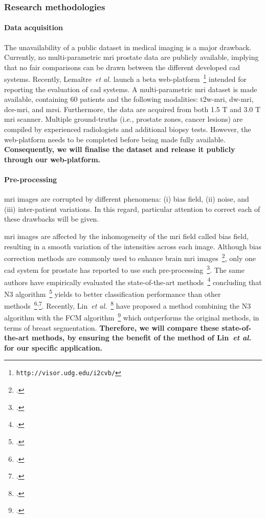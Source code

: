 \subsubsection{Research methodologies}
\label{sec:methodologies}

\paragraph{Data acquisition}

The unavailability of a public dataset in medical imaging is a major drawback.
Currently, no multi-parametric \ac{mri} prostate data are publicly available, implying that no fair comparisons can be drawn between the different developed \ac{cad} systems.
Recently, Lema\^itre~\emph{et al.} launch a beta web-platform~\footnote{\texttt{http://visor.udg.edu/i2cvb/}} intended for reporting the evaluation of \ac{cad} systems.
A multi-parametric \ac{mri} dataset is made available, containing 60 patients and the following modalities: \ac{t2w}-\ac{mri}, \ac{dw}-\ac{mri}, \ac{dce}-\ac{mri}, and \ac{mrsi}.
Furthermore, the data are acquired from both 1.5 T and 3.0 T \ac{mri} scanner.
Multiple ground-truths (i.e., prostate zones, cancer lesions) are compiled by experienced radiologists and additional biopsy tests.
However, the web-platform needs to be completed before being made fully available.
\textbf{Consequently, we will finalise the dataset and release it publicly through our web-platform.}

\paragraph{Pre-processing}

\Ac{mri} images are corrupted by different phenomena: (i) bias field, (ii) noise, and (iii) inter-patient variations.
In this regard, particular attention to correct each of these drawbacks will be given.

\Ac{mri} images are affected by the inhomogeneity of the \ac{mri} field called bias field, resulting in a smooth variation of the intensities across each image.
Although bias correction methods are commonly used to enhance brain \ac{mri} images~\footcite{Vovk2007}, only one \ac{cad} system for prostate has reported to use such pre-processing~\footcite{Viswanath2009}.
The same authors have empirically evaluated the state-of-the-art methods~\footcite{viswanath2011empirical} concluding that N3 algorithm~\footcite{Sled1998} yields to better classification performance than other methods~\footcite{Styner2000}\textsuperscript{,}\footcite{Cohen2000}.
Recently, Lin~\emph{et al.}~\footcite{Lin2011} have proposed a method combining the N3 algorithm with the FCM algorithm~\footcite{Ahmed2002} which outperforms the original methods, in terms of breast segmentation.
\textbf{Therefore, we will compare these state-of-the-art methods, by ensuring the benefit of the method of Lin~\emph{et al.} for our specific application.}


